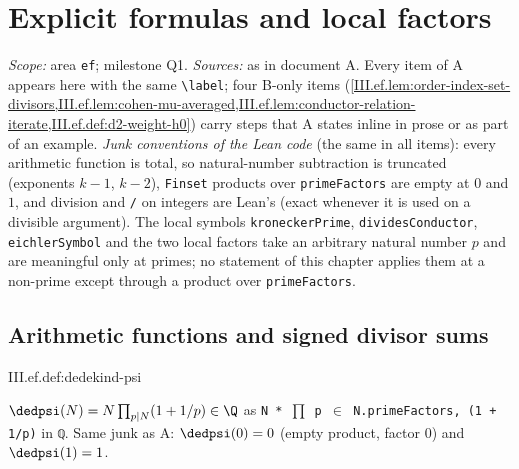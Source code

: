
\chapter{Explicit formulas and local factors}\label{ch:ch-iii-01-explicit}

\noindent\emph{Scope:} area \texttt{ef}; milestone Q1. \emph{Sources:} as in document A. Every item of A appears here with the same \texttt{\textbackslash label};
four B-only items (\cref{III.ef.lem:order-index-set-divisors,III.ef.lem:cohen-mu-averaged,III.ef.lem:conductor-relation-iterate,III.ef.def:d2-weight-h0})
carry steps that A states inline in prose or as part of an example.
\emph{Junk conventions of the Lean code} (the same in all items): every arithmetic function is total, so natural-number subtraction is truncated
(exponents $k-1$, $k-2$), \texttt{Finset} products over \texttt{primeFactors} are empty at $0$ and $1$, and division and \texttt{/} on integers are Lean's
(exact whenever it is used on a divisible argument). The local symbols \texttt{kroneckerPrime}, \texttt{dividesConductor}, \texttt{eichlerSymbol} and the two local factors
take an arbitrary natural number $p$ and are meaningful only at primes; no statement of this chapter applies them at a non-prime except through a
product over \texttt{primeFactors}.
\section{Arithmetic functions and signed divisor sums}\label{sec:ef-arith}

\begin{definition}
\end{definition}
\begin{tfformal}{III.ef.def:dedekind-psi}
\begin{tffidelity}
$\dedpsi(N)=N\prod_{p\mid N}(1+1/p)\in\Q$ as \texttt{N * \(\prod\) p \(\in\) N.primeFactors, (1 + 1/p)} in \texttt{ℚ}. Same junk as A: $\dedpsi(0)=0$ (empty product, factor $0$) and $\dedpsi(1)=1$.
\end{tffidelity}
\end{tfformal}

